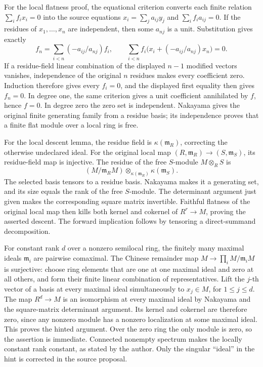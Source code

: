 For the local flatness proof, the equational criterion converts each finite relation \(\sum_i f_i x_i=0\) into the source equations \(x_i=\sum_j a_{ij}y_j\) and \(\sum_i f_i a_{ij}=0\). If the residues of \(x_1,\ldots,x_n\) are independent, then some \(a_{nj}\) is a unit. Substitution gives exactly \[
f_n=\sum_{i<n}(-a_{ij}/a_{nj})f_i,
\qquad
\sum_{i<n}f_i\bigl(x_i+(-a_{ij}/a_{nj})x_n\bigr)=0.
\] If a residue-field linear combination of the displayed \(n-1\) modified vectors vanishes, independence of the original \(n\) residues makes every coefficient zero. Induction therefore gives every \(f_i=0\), and the displayed first equality then gives \(f_n=0\). In degree one, the same criterion gives a unit coefficient annihilated by \(f\), hence \(f=0\). In degree zero the zero set is independent. Nakayama gives the original finite generating family from a residue basis; its independence proves that a finite flat module over a local ring is free.

For the local descent lemma, the residue field is \(\kappa(\mathfrak m_R)\), correcting the otherwise undeclared ideal. For the original local map \((R,\mathfrak m_R)\to(S,\mathfrak m_S)\), its residue-field map is injective. The residue of the free \(S\)-module \(M\otimes_RS\) is \[
(M/\mathfrak m_RM)\otimes_{\kappa(\mathfrak m_R)}\kappa(\mathfrak m_S).
\] The selected basis tensors to a residue basis. Nakayama makes it a generating set, and its size equals the rank of the free \(S\)-module. The determinant argument just given makes the corresponding square matrix invertible. Faithful flatness of the original local map then kills both kernel and cokernel of \(R^r\to M\), proving the asserted descent. The forward implication follows by tensoring a direct-summand decomposition.

For constant rank \(d\) over a nonzero semilocal ring, the finitely many maximal ideals \(\mathfrak m_i\) are pairwise comaximal. The Chinese remainder map \(M\to\prod_iM/\mathfrak m_iM\) is surjective: choose ring elements that are one at one maximal ideal and zero at all others, and form their finite linear combination of representatives. Lift the \(j\)-th vector of a basis at every maximal ideal simultaneously to \(x_j\in M\), for \(1\leq j\leq d\). The map \(R^d\to M\) is an isomorphism at every maximal ideal by Nakayama and the square-matrix determinant argument. Its kernel and cokernel are therefore zero, since any nonzero module has a nonzero localization at some maximal ideal. This proves the hinted argument. Over the zero ring the only module is zero, so the assertion is immediate. Connected nonempty spectrum makes the locally constant rank constant, as stated by the author. Only the singular ``ideal'' in the hint is corrected in the source proposal.

